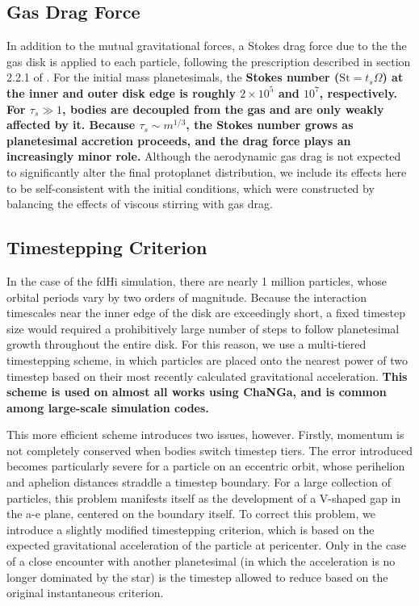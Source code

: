 \documentclass[twocolumn,linenumbers]{aastex63}
\begin{document}
\subsection{Gas Drag Force}

In addition to the mutual gravitational forces, a Stokes drag force due to the the gas disk is applied to each particle, following the prescription described in section 2.2.1 of \citet{morishima10}. For the initial mass planetesimals, the \textbf{Stokes number ($\textrm{St} = t_{s} \Omega$) at the inner and outer disk edge is roughly $2 \times 10^{5}$ and $10^{7}$, respectively. For $\tau_{s} \gg 1$, bodies are decoupled from the gas and are only weakly affected by it. Because $\tau_{s} \sim m^{1/3}$, the Stokes number grows as planetesimal accretion proceeds, and the drag force plays an increasingly minor role.} Although the aerodynamic gas drag is not expected to significantly alter the final protoplanet distribution, we include its effects here to be self-consistent with the initial conditions, which were constructed by balancing the effects of viscous stirring with gas drag.

\subsection{Timestepping Criterion}

In the case of the fdHi simulation, there are nearly 1 million
particles, whose orbital periods vary by two orders of magnitude. Because the
interaction timescales near the inner edge of the
disk are exceedingly short, a fixed timestep size would required a prohibitively large
number of steps to follow planetesimal growth throughout the entire
disk. For this reason, we use a multi-tiered timestepping scheme, in
which particles are placed onto the nearest power of two timestep
based on their most recently calculated gravitational
acceleration. \textbf{This scheme is used on almost all works using ChaNGa,
and is common among large-scale simulation codes.}

This more efficient scheme introduces two issues, however. Firstly,
momentum is not completely conserved when bodies switch timestep tiers. The
error introduced becomes particularly severe for a particle on an
eccentric orbit, whose perihelion and aphelion distances
straddle a timestep boundary. For a large collection of particles,
this problem manifests itself as the development of a V-shaped gap in the a-e plane, centered on the boundary itself. To correct this problem, we introduce a slightly modified timestepping criterion, which is based on the expected gravitational acceleration of the particle at pericenter. Only in the case of a close encounter with another planetesimal (in which the acceleration is no longer dominated by the star) is the timestep allowed to reduce based on the original instantaneous criterion.
\end{document}
